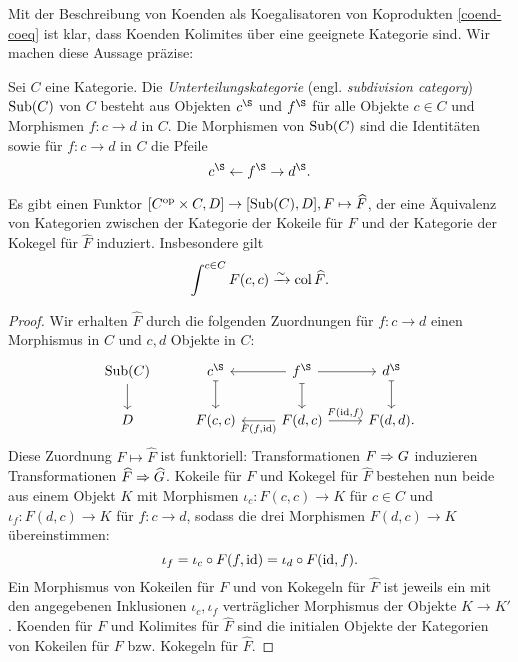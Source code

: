 Mit der Beschreibung von Koenden als Koegalisatoren von Koprodukten
\ref{coend-coeq} ist klar, dass Koenden Kolimites über eine geeignete
Kategorie sind. Wir machen diese Aussage präzise:
\begin{defn} \label{def:sub}
  Sei $C$ eine Kategorie. Die \emph{Unterteilungskategorie}
  (engl. \emph{subdivision category}) $\operatorname{Sub}(C)$ von $C$ besteht aus
  Objekten $c^\S$ und $f^\S$ für alle Objekte $c \in C$ und Morphismen
  $f: c \to d$ in $C$. Die Morphismen von $\operatorname{Sub}(C)$ sind die
  Identitäten sowie für $f: c \to d$ in $C$ die Pfeile
  \[ c^\S \from f^\S \to d^\S. \]
\end{defn}
\begin{prop} \label{coend-col}
  Es gibt einen Funktor $[C^\mathrm{op} \times C, D] \to [\operatorname{Sub}(C), D], F
  \mapsto \widehat{F}$, der eine Äquivalenz von Kategorien zwischen
  der Kategorie der Kokeile für $F$ und der Kategorie der Kokegel für
  $\widehat{F}$ induziert. Insbesondere gilt
  \[ \int^{c \in C} F(c, c) \xrightarrow[]{\sim} \operatorname{col} \widehat{F}. \]
\end{prop}
\begin{proof}
  Wir erhalten $\widehat{F}$ durch die folgenden Zuordnungen für $f: c \to
  d$ einen Morphismus in $C$ und $c, d$ Objekte in $C$:
  \[ \begin{tikzcd}
    \Sub(C) \arrow{d}
    & c^\S \arrow[mapsto]{d}
    & \arrow{l} f^\S \arrow[mapsto]{d} \arrow{r}
    & d^\S \arrow[mapsto]{d} \\
    D
    & F(c, c)
    & \arrow{l}{F(f, \id)} F(d, c) \arrow{r}{F(\id, f)}
    & F(d, d).
  \end{tikzcd} \]
  Diese Zuordnung $F \mapsto \widehat{F}$ ist funktoriell:
  Transformationen $F \Rightarrow G$ induzieren Transformationen
  $\widehat{F} \Rightarrow \widehat{G}$. Kokeile für $F$ und Kokegel für
  $\widehat{F}$ bestehen nun beide aus einem Objekt $K$ mit Morphismen
  $\iota_c: F(c, c) \to K$ für $c \in C$ und $\iota_f: F(d, c) \to K$
  für $f: c \to d$, sodass die drei Morphismen $F(d, c) \to K$
  übereinstimmen:
  \[ \iota_f = \iota_c \circ F(f, \operatorname{id}) = \iota_d \circ F(\operatorname{id}, f). \]
  Ein Morphismus von Kokeilen für $F$ und von Kokegeln für
  $\widehat{F}$ ist jeweils ein mit den angegebenen Inklusionen
  $\iota_c, \iota_f$ verträglicher Morphismus der Objekte $K \to
  K'$. Koenden für $F$ und Kolimites für $\widehat{F}$ sind die
  initialen Objekte der Kategorien von Kokeilen für $F$ bzw. Kokegeln
  für $\widehat{F}$.
\end{proof}
